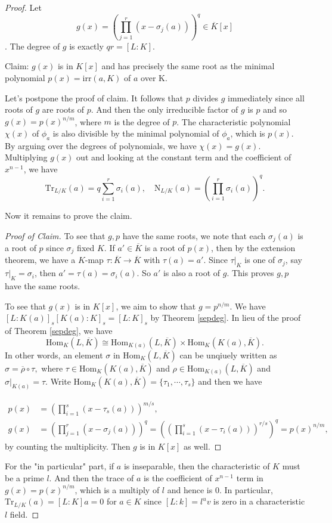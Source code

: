 \documentclass[12pt]{report}
\theoremstyle{definition}
\newcommand{\Hom}{\text{Hom}}
\newcommand{\irr}{\text{irr}}
\newcommand{\ok}{\overline{K}}
\newcommand{\Tr}{\text{Tr}}
\newcommand{\nm}{\text{N}}
\begin{document}
\begin{proof}
	Let $$g(x)=(\prod_{j=1}^r(x-\sigma_j(a)))^q \in \ok[x]$$. The degree of $g$ is exactly $qr=[L:K]$.

	Claim: $g(x)$ is in $K[x]$ and has precisely the same root as the minimal polynomial $p(x)=\irr(a,K)$ of $a$ over K.

	Let's postpone the proof of claim. It follows that $p$ divides $g$ immediately since all roots of $g$ are roots of $p$.  And then the only irreducible factor of $g$ is $p$ and so $g(x)=p(x)^{n/m}$, where $m$ is the degree of $p$. The characteristic polynomial $\chi(x)$ of $\phi_a$ is also divisible by the minimal polynomial of $\phi_a$, which is $p(x)$. By arguing over the degrees of polynomials, we have $\chi(x)=g(x)$. Multiplying $g(x)$ out and looking at the constant term and the coefficient of $x^{n-1}$, we have $$\Tr_{L/K}(a)=q\sum_{i=1}^r \sigma_i(a),\quad \nm_{L/K}(a) = (\prod_{i=1}^r \sigma_i(a))^q. $$

	Now it remains to prove the claim.
	\begin{proof}[Proof of Claim]
		To see that $g,p$ have the same roots, we note that each $\sigma_j(a)$ is a root of $p$ since $\sigma_j$ fixed $K$. If $a'\in \ok$ is a root of $p(x)$, then by the extension theorem, we have a $K$-map $\tau:\ok\to \ok$ with $\tau(a)=a'$. Since $\tau|_K$ is one of $\sigma_j$, say $\tau|_K=\sigma_i$, then $a'=\tau(a)=\sigma_i(a)$. So $a'$ is also a root of $g$. This proves $g,p$ have the same roots.

		To see that $g(x)$ is in $K[x]$, we aim to show that $g=p^{n/m}$. We have $[L:K(a)]_s [K(a):K]_s=[L:K]_s$ by Theorem \ref{sepdeg}. In lieu of the proof of Theorem \ref{sepdeg}, we have $$\Hom_K(L,\ok)\cong \Hom_{K(a)}(L,\ok)\times\Hom_K(K(a),\ok).$$ In other words, an element $\sigma$ in $\Hom_K(L,\ok)$ can be unqiuely written as $\sigma = \overline{\rho}\circ\tau,$ where $\tau\in\Hom_K(K(a),\ok)$ and $\rho\in  \Hom_{K(a)}(L,\ok)$ and $\sigma|_{K(a)}=\tau$. Write $\Hom_K(K(a),\ok)=\{\tau_1,\cdots,\tau_s\}$ and then we have

		\begin{align*}
			p(x) & = (\prod_{i=1}^s(x-\tau_s(a)))^{m/s},                                                    \\
			g(x) & = (\prod_{j=1}^r(x-\sigma_j(a)))^q =((\prod_{i=1}^s(x-\tau_i(a)))^{r/s})^q = p(x)^{n/m},
		\end{align*} by counting the multiplicity. Then $g$ is in $K[x]$ as well.
	\end{proof}

	For the "in particular" part, if $a$ is inseparable, then the characteristic of $K$ must be a prime $l$. And then the trace of $a$ is the coefficient of $x^{n-1}$ term in $g(x)=p(x)^{n/m}$, which is a multiply of $l$ and hence is 0. In particular, $\Tr_{L/K}(a)=[L:K] a = 0$ for $a\in K$ since $[L:k]=l^uv$ is zero in a characteristic $l$ field.
\end{proof}
\end{document}
